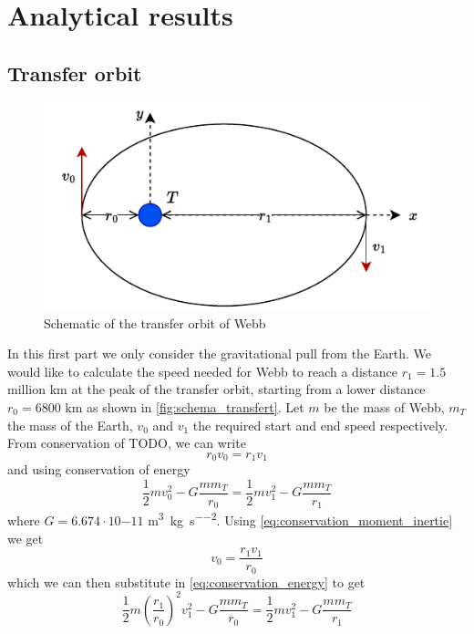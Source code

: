 \section{Analytical results}

\subsection{Transfer orbit}

\begin{figure}[h]
    \centering
    \includegraphics[width=0.6\linewidth]{figures/transfert.pdf}
    \caption{Schematic of the transfer orbit of Webb}
    \label{fig:schema_transfert}
\end{figure}
In this first part we only consider the gravitational pull from the Earth. We would like to calculate the speed needed for Webb to reach a distance \(r_1 = 1.5\) million km at the peak of the transfer orbit, starting from a lower distance \(r_0 = 6800\) km as shown in \autoref{fig:schema_transfert}. Let \(m\) be the mass of Webb, \(m_T\) the mass of the Earth, \(v_0\) and \(v_1\) the required start and end speed respectively. From conservation of TODO, we can write
\begin{equation}
    r_0 v_0 = r_1 v_1
    \label{eq:conservation_moment_inertie}
\end{equation}
and using conservation of energy
\begin{equation}
    \frac{1}{2} m v_0^2 - G \frac{m m_T}{r_0} = \frac{1}{2} m v_1^2 - G \frac{m m_T}{r_1}
    \label{eq:conservation_energy}
\end{equation}
where \(G = 6.674 \cdot 10{-11}\) \si{\meter\cubed\per\kilo\gram\per\second\squared}. Using \autoref{eq:conservation_moment_inertie} we get
\begin{equation}
    v_0 = \frac{r_1 v_1}{r_0}
    \label{eq:v0_substitution}
\end{equation}
which we can then substitute in \autoref{eq:conservation_energy} to get
\begin{equation}
    \frac{1}{2} m \left(\frac{r_1}{r_0}\right)^2 v_1^2 - G \frac{m m_T}{r_0} = \frac{1}{2} m v_1^2 - G \frac{m m_T}{r_1}
\end{equation}
